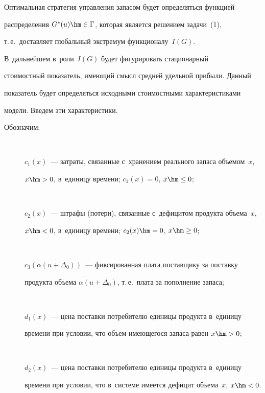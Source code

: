   Оптимальная стратегия управления запасом будет определяться функцией 

распределения $G^*(u)\hm\in\Gamma$, которая является решением задачи~(1), 

т.\,е.\ доставляет глобальный экстремум функционалу~$I(G)$.

  

  В~дальнейшем в~роли~$I(G)$ будет фигурировать стационарный 

стоимостный показатель, имеющий смысл средней удельной прибыли. Данный 

показатель будет определяться исходными стоимостными характеристиками 

модели. Введем эти характеристики. 

  

  Обозначим:\\[-9pt]

  \begin{description}

\item[\,]   $c_1(x)$~--- затраты, связанные с~хранением реального запаса объемом~$x$, 

$x\hm>0$, в~единицу времени; $c_1(x)=0$, $x\hm\leq0$;\\[-9pt]

  

\item[\,]   $c_2(x)$~--- штрафы (потери), связанные с~дефицитом продукта объема~$x$, 

$x\hm<0$, в~единицу времени; $c_2(x)\hm=0$, $x\hm\geq0$;\\[-9pt]

  

\item[\,]   $c_3(\alpha(u+\Delta_0))$~--- фиксированная плата поставщику за поставку 

продукта объема $\alpha(u+\Delta_0)$, т.\,е.\ плата за пополнение запаса;\\[-9pt]

  

\item[\,]   $d_1(x)$~--- цена поставки потребителю единицы продукта в~единицу 

времени при условии, что объем имеющегося запаса равен $x\hm>0$;\\[-9pt]

  

 \item[\,]  $d_2(x)$~--- цена поставки потребителю единицы продукта в~единицу 

времени при условии, что в~системе имеется дефицит объема~$x$, $x\hm<0$.\\[-9pt]

\end{description}

